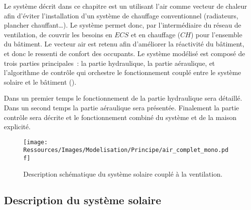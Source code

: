 Le système décrit dans ce chapitre est un  utilisant l’air comme vecteur de chaleur
afin d’éviter l’installation d’un système de chauffage conventionnel (radiateurs, plancher
chauffant\dots). Le système permet donc, par l’intermédiaire du réseau de ventilation, de
couvrir les besoins en $ECS$ et en chauffage ($CH$) pour l’ensemble du bâtiment.
Le vecteur air est retenu afin d’améliorer la réactivité du bâtiment, et donc le
ressenti de confort des occupants. Le système modélisé est composé de trois
parties principales~: la partie hydraulique, la partie aéraulique, et l’algorithme de
contrôle qui orchestre le fonctionnement couplé entre le système solaire et le bâtiment
().

Dans un premier temps le fonctionnement de la partie hydraulique sera détaillé. Dans un
second temps la partie aéraulique sera présentée. Finalement la partie contrôle sera
décrite et le fonctionnement combiné du système et de la maison explicité.

\begin{figure}
    \centering
    \texttt{[image: Ressources/Images/Modelisation/Principe/air\_complet\_mono.pdf]}
    \caption{Description schématique du système solaire couplé à la ventilation.}
    \label{fig:air_complet_mono}
\end{figure}




\subsection{Description du système solaire} %
\label{sub:description_du_systeme_solaire}
